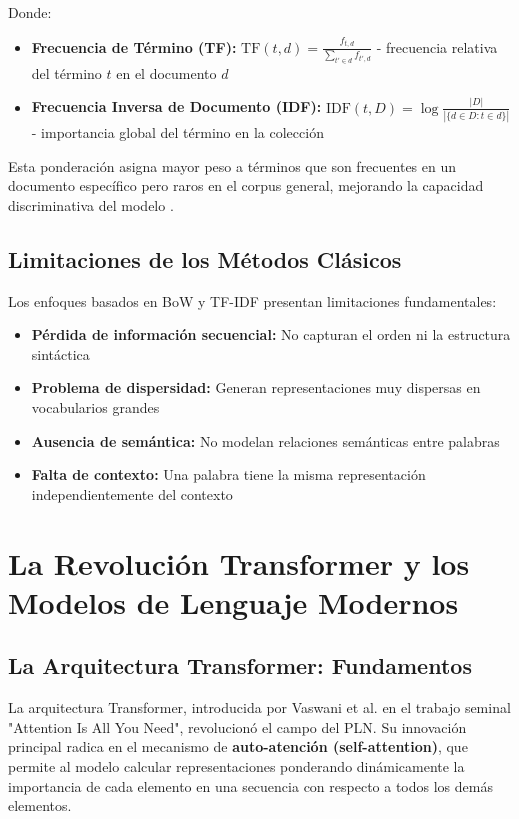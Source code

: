 Donde:
\begin{itemize}
    \item \textbf{Frecuencia de Término (TF):} $\text{TF}(t,d) = \frac{f_{t,d}}{\sum_{t' \in d} f_{t',d}}$ - frecuencia relativa del término $t$ en el documento $d$
    \item \textbf{Frecuencia Inversa de Documento (IDF):} $\text{IDF}(t,D) = \log\frac{|D|}{|\{d \in D : t \in d\}|}$ - importancia global del término en la colección
\end{itemize}

Esta ponderación asigna mayor peso a términos que son frecuentes en un documento específico pero raros en el corpus general, mejorando la capacidad discriminativa del modelo \cite{thota2018fake}.

\subsection{Limitaciones de los Métodos Clásicos}

Los enfoques basados en BoW y TF-IDF presentan limitaciones fundamentales:
\begin{itemize}
    \item \textbf{Pérdida de información secuencial:} No capturan el orden ni la estructura sintáctica
    \item \textbf{Problema de dispersidad:} Generan representaciones muy dispersas en vocabularios grandes
    \item \textbf{Ausencia de semántica:} No modelan relaciones semánticas entre palabras
    \item \textbf{Falta de contexto:} Una palabra tiene la misma representación independientemente del contexto
\end{itemize}

\section{La Revolución Transformer y los Modelos de Lenguaje Modernos}
\label{sec:transformers_modelos_lenguaje}

\subsection{La Arquitectura Transformer: Fundamentos}

La arquitectura Transformer, introducida por Vaswani et al. \cite{vaswani2017attention} en el trabajo seminal "Attention Is All You Need", revolucionó el campo del PLN. Su innovación principal radica en el mecanismo de \textbf{auto-atención (self-attention)}, que permite al modelo calcular representaciones ponderando dinámicamente la importancia de cada elemento en una secuencia con respecto a todos los demás elementos.

